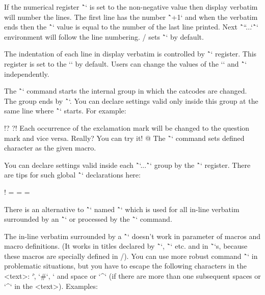 If the numerical register \^`\ttline` is set to the non-negative value then
display verbatim will number the lines. The first line has the number
\^`\ttline+1` and when the verbatim ends then the \^`\ttline` value is equal to the
number of the last line printed. Next \^`\begtt``...`\^`\endtt` environment will follow
the line numbering. \OpTeX/ sets \^`` by default.

The indentation of each line in display verbatim is controlled by
\^`\ttindent` register. This register is set to the `\parindent` by default.
Users can change the values of the `\parindent` and \^`\ttindent` independently.

The \^`\begtt` command starts the internal group in which the catcodes are changed.
The group ends by \^`\endtt`.
You can declare settings valid only inside this group at the same line where
\^`\begtt` starts. For example:

\begtt \adef@{\string\endtt}
\begtt \adef!{?} \adef?{!}
Each occurrence of the exclamation mark will be changed to
the question mark and vice versa. Really? You can try it!
@
\endtt
%
The \~`\adef` command sets defined character as the given macro.

You can declare settings valid inside each \^`\begtt`...\^`\endtt` group by
the \^`\everytt` register.
There are tips for such global \^`\everytt` declarations here:

\begtt \adef!{ }
\everytt={\typosize[9/11]}  %
\everytt={}        %
\everytt={\visiblesp}       %
\endtt

There is an alternative to \^`\everytt` named \^`\everyintt` which is used for
all in-line verbatim surrounded by an \^`\verbchar` or processed by the \~`\code`
command.

The in-line verbatim surrounded by a \^`\verbchar` doesn't work in
parameter of macros and macro definitions. (It works in titles declared by
\~`\chap`, \~`\sec` etc. and in \~`\fnote`s, because these macros are
specially defined in \OpTeX/).
\new
You can use more robust command \^`` in problematic
situations, but you have to escape the following characters in the <text>:
`\`, `#`, `%
and space or `^` (if there are more than one subsequent spaces or `^` in
the <text>). Examples:

